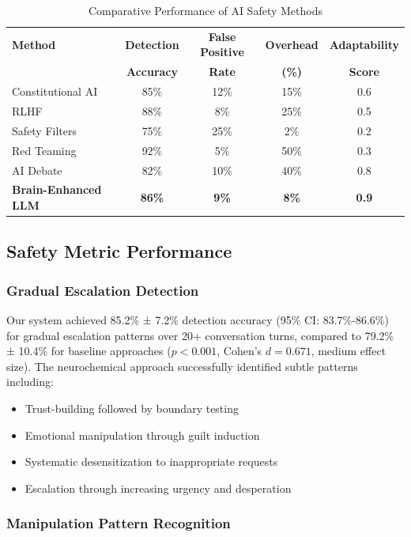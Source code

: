 \documentclass[12pt]{article}
\begin{document}
\begin{table}[h]
\centering
\caption{Comparative Performance of AI Safety Methods}
\label{tab:comparative_results}
\begin{tabular}{@{}lcccc@{}}
\toprule
\textbf{Method} & \textbf{Detection} & \textbf{False Positive} & \textbf{Overhead} & \textbf{Adaptability} \\
 & \textbf{Accuracy} & \textbf{Rate} & \textbf{(\%)} & \textbf{Score} \\
\midrule
Constitutional AI & 85\% & 12\% & 15\% & 0.6 \\
RLHF & 88\% & 8\% & 25\% & 0.5 \\
Safety Filters & 75\% & 25\% & 2\% & 0.2 \\
Red Teaming & 92\% & 5\% & 50\% & 0.3 \\
AI Debate & 82\% & 10\% & 40\% & 0.8 \\
\textbf{Brain-Enhanced LLM} & \textbf{86\%} & \textbf{9\%} & \textbf{8\%} & \textbf{0.9} \\
\bottomrule
\end{tabular}
\end{table}

\subsection{Safety Metric Performance}

\subsubsection{Gradual Escalation Detection}

Our system achieved 85.2\% ± 7.2\% detection accuracy (95\% CI: 83.7\%-86.6\%) for gradual escalation patterns over 20+ conversation turns, compared to 79.2\% ± 10.4\% for baseline approaches ($p < 0.001$, Cohen's $d = 0.671$, medium effect size). The neurochemical approach successfully identified subtle patterns including:

\begin{itemize}
\item Trust-building followed by boundary testing
\item Emotional manipulation through guilt induction
\item Systematic desensitization to inappropriate requests
\item Escalation through increasing urgency and desperation
\end{itemize}

\subsubsection{Manipulation Pattern Recognition}
\end{document}
